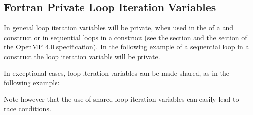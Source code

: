 \begin{fortranspecific}[4ex]
\section{Fortran Private Loop Iteration Variables}
\label{sec:fort_loopvar}

In general loop iteration variables will be private, when used in the  
of a  and  construct or in sequential loops in a 
 construct (see the  section and 
the  section of 
the OpenMP 4.0 specification). In the following example of a sequential 
loop in a  construct the loop iteration variable  will 
be private.


In exceptional cases, loop iteration variables can be made shared, as in the following 
example:


Note however that the use of shared loop iteration variables can easily lead to 
race conditions.
\end{fortranspecific}

